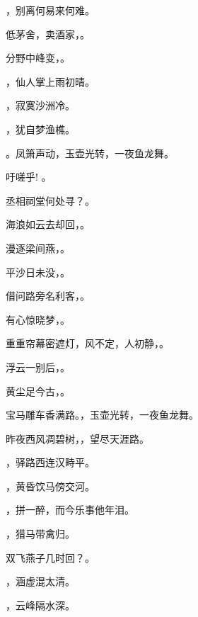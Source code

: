 \documentclass[12pt, a4paper, addpoints]{exam}
\begin{document}
\begin{questions}
\question[1] \uline{\qquad\qquad\qquad}，别离何易来何难。

\question[1] 低茅舍，卖酒家，\uline{\qquad\qquad\qquad}。

\question[1] 分野中峰变，\uline{\qquad\qquad\qquad}。

\question[1] \uline{\qquad\qquad\qquad}，仙人掌上雨初晴。

\question[1] \uline{\qquad\qquad\qquad}，寂寞沙洲冷。

\question[1] \uline{\qquad\qquad\qquad}，犹自梦渔樵。

\question[1] \uline{\qquad\qquad\qquad}。凤箫声动，玉壶光转，一夜鱼龙舞。

\question[1] 吁嗟乎! \uline{\qquad\qquad\qquad}。

\question[1] 丞相祠堂何处寻？\uline{\qquad\qquad\qquad}。

\question[1] 海浪如云去却回，\uline{\qquad\qquad\qquad}。

\question[1] 漫逐梁间燕，\uline{\qquad\qquad\qquad}。

\question[1] 平沙日未没，\uline{\qquad\qquad\qquad}。

\question[1] 借问路旁名利客，\uline{\qquad\qquad\qquad}。

\question[1] 有心惊晓梦，\uline{\qquad\qquad\qquad}。

\question[1] 重重帘幕密遮灯，风不定，人初静，\uline{\qquad\qquad\qquad}。

\question[1] 浮云一别后，\uline{\qquad\qquad\qquad}。

\question[1] 黄尘足今古，\uline{\qquad\qquad\qquad}。

\question[1] 宝马雕车香满路。\uline{\qquad\qquad\qquad}，玉壶光转，一夜鱼龙舞。

\question[1] 昨夜西风凋碧树，\uline{\qquad\qquad\qquad}，望尽天涯路。

\question[1] \uline{\qquad\qquad\qquad}，驿路西连汉畤平。

\question[1] \uline{\qquad\qquad\qquad}，黄昏饮马傍交河。

\question[1] \uline{\qquad\qquad\qquad}，拼一醉，而今乐事他年泪。

\question[1] \uline{\qquad\qquad\qquad}，猎马带禽归。

\question[1] 双飞燕子几时回？\uline{\qquad\qquad\qquad}。

\question[1] \uline{\qquad\qquad\qquad}，涵虚混太清。

\question[1] \uline{\qquad\qquad\qquad}，云峰隔水深。


\end{questions}
\end{document}

